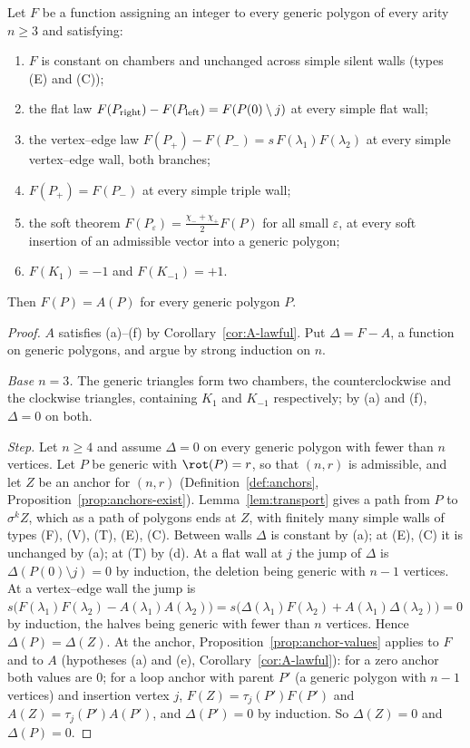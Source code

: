 \begin{theorem}\label{thm:uniqueness}\leanok
Let $F$ be a function assigning an integer to every generic polygon of every
arity $n\geq3$ and satisfying:
\begin{enumerate}
\item[(a)] $F$ is constant on chambers and unchanged across simple silent
walls (types (E) and (C));
\item[(b)] the flat law $F(P_{\rm right})-F(P_{\rm left})=F(P(0)\setminus j)$
at every simple flat wall;
\item[(c)] the vertex--edge law $F(P_+)-F(P_-)=s\,F(\lambda_1)F(\lambda_2)$
at every simple vertex--edge wall, both branches;
\item[(d)] $F(P_+)=F(P_-)$ at every simple triple wall;
\item[(e)] the soft theorem $F(P_\varepsilon)=\frac{\chi_-+\chi_+}2F(P)$ for
all small $\varepsilon$, at every soft insertion of an admissible vector into
a generic polygon;
\item[(f)] $F(K_1)=-1$ and $F(K_{-1})=+1$.
\end{enumerate}
Then $F(P)=A(P)$ for every generic polygon $P$. 
\end{theorem}
\begin{proof}\leanok{}
$A$ satisfies (a)--(f) by Corollary~\ref{cor:A-lawful}. Put $\Delta=F-A$, a
function on generic polygons, and argue by strong induction on $n$.

\emph{Base $n=3$.} The generic triangles form two chambers, the
counterclockwise and the clockwise triangles, containing $K_1$ and $K_{-1}$
respectively; by (a) and (f), $\Delta=0$ on both.

\emph{Step.} Let $n\geq4$ and assume $\Delta=0$ on every generic polygon with
fewer than $n$ vertices. Let $P$ be generic with $\rot(P)=r$, so that $(n,r)$
is admissible, and let $Z$ be an anchor for $(n,r)$
(Definition~\ref{def:anchors}, Proposition~\ref{prop:anchors-exist}).
Lemma~\ref{lem:transport} gives a path from $P$ to $\sigma^kZ$, which as a
path of polygons ends at $Z$, with finitely many simple walls of types (F),
(V), (T), (E), (C). Between walls $\Delta$ is constant by (a); at (E), (C) it
is unchanged by (a); at (T) by (d). At a flat wall at $j$ the jump of
$\Delta$ is $\Delta(P(0)\setminus j)=0$ by induction, the deletion being
generic with $n-1$ vertices. At a vertex--edge wall the jump is
$s\bigl(F(\lambda_1)F(\lambda_2)-A(\lambda_1)A(\lambda_2)\bigr)
=s\bigl(\Delta(\lambda_1)F(\lambda_2)+A(\lambda_1)\Delta(\lambda_2)\bigr)=0$
by induction, the halves being generic with fewer than $n$ vertices. Hence
$\Delta(P)=\Delta(Z)$. At the anchor, Proposition~\ref{prop:anchor-values}
applies to $F$ and to $A$ (hypotheses (a) and (e),
Corollary~\ref{cor:A-lawful}):
for a zero anchor both values are $0$; for a loop anchor with parent $P'$
(a generic polygon with $n-1$ vertices) and insertion vertex $j$,
$F(Z)=\tau_j(P')F(P')$ and $A(Z)=\tau_j(P')A(P')$, and $\Delta(P')=0$ by
induction. So $\Delta(Z)=0$ and $\Delta(P)=0$.
\end{proof}

